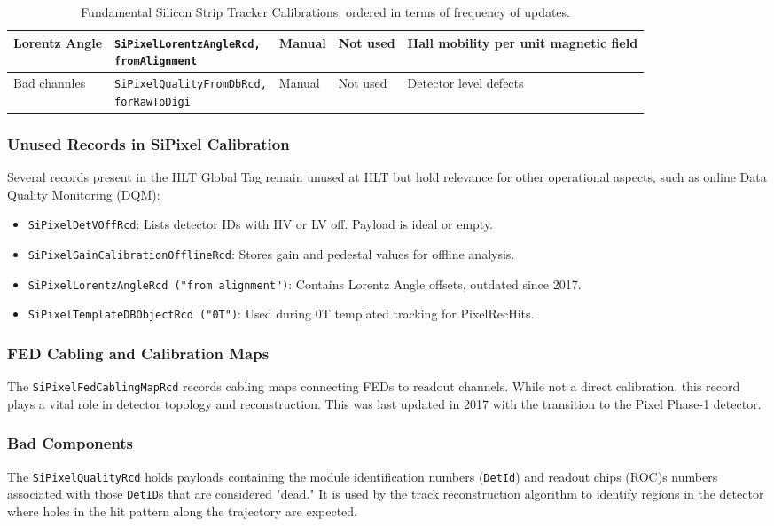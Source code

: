 \begin{table}[h!]
\begin{adjustbox}{max width=\textwidth}
\begin{tabular}{p{2.5cm}|p{5.7cm}|p{1.5cm}|p{2.5cm}|p{3.0cm}}
      Lorentz Angle   & \parbox[t]{5cm}{\texttt{SiPixelLorentzAngleRcd,}\\\texttt{fromAlignment}} & Manual & Not used & Hall mobility per unit magnetic field \\ \hline
      Bad channles    & \parbox[t]{5cm}{\texttt{SiPixelQualityFromDbRcd,}\\\texttt{forRawToDigi}} & Manual & Not used & Detector level defects \\ 
    \end{tabular}
    \end{adjustbox}
    \caption{Fundamental Silicon Strip Tracker Calibrations, ordered in terms of frequency of updates.}
    \label{tab:PixelCalibrations_critical}
\end{table}

\subsubsection{Unused Records in SiPixel Calibration}
Several records present in the HLT Global Tag remain unused at HLT but hold relevance for other operational aspects, such as online Data Quality Monitoring (DQM):
\begin{itemize}
    \item \texttt{SiPixelDetVOffRcd}: Lists detector IDs with HV or LV off. Payload is ideal or empty.
    \item \texttt{SiPixelGainCalibrationOfflineRcd}: Stores gain and pedestal values for offline analysis.
    \item \texttt{SiPixelLorentzAngleRcd ("from alignment")}: Contains Lorentz Angle offsets, outdated since 2017.
    \item \texttt{SiPixelTemplateDBObjectRcd ("0T")}: Used during 0T templated tracking for PixelRecHits.
\end{itemize}

\subsubsection{FED Cabling and Calibration Maps}
The \texttt{SiPixelFedCablingMapRcd} records cabling maps connecting FEDs to readout channels. While not a direct calibration, this record plays a vital role in detector topology and reconstruction. This was last updated in 2017 with the transition to the Pixel Phase-1 detector.

\subsubsection{Bad Components}
The \texttt{SiPixelQualityRcd} holds payloads containing the module identification numbers (\texttt{DetId}) and readout chips (ROC)s numbers associated with those \texttt{DetID}s that are considered "dead." It is used by the track reconstruction algorithm to identify regions in the detector where holes in the hit pattern along the trajectory are expected.\\

